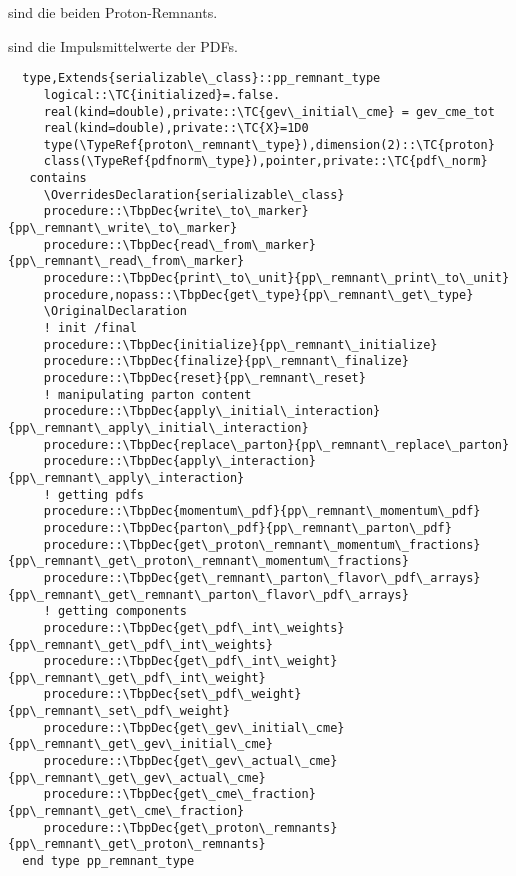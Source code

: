
 sind die beiden Proton-Remnants.

 sind die Impulsmittelwerte der PDFs.
\begin{Verbatim}
  type,Extends{serializable\_class}::pp_remnant_type
     logical::\TC{initialized}=.false.
     real(kind=double),private::\TC{gev\_initial\_cme} = gev_cme_tot
     real(kind=double),private::\TC{X}=1D0
     type(\TypeRef{proton\_remnant\_type}),dimension(2)::\TC{proton}
     class(\TypeRef{pdfnorm\_type}),pointer,private::\TC{pdf\_norm}
   contains
     \OverridesDeclaration{serializable\_class}
     procedure::\TbpDec{write\_to\_marker}{pp\_remnant\_write\_to\_marker}
     procedure::\TbpDec{read\_from\_marker}{pp\_remnant\_read\_from\_marker}
     procedure::\TbpDec{print\_to\_unit}{pp\_remnant\_print\_to\_unit}
     procedure,nopass::\TbpDec{get\_type}{pp\_remnant\_get\_type}
     \OriginalDeclaration
     ! init /final
     procedure::\TbpDec{initialize}{pp\_remnant\_initialize}
     procedure::\TbpDec{finalize}{pp\_remnant\_finalize}
     procedure::\TbpDec{reset}{pp\_remnant\_reset}
     ! manipulating parton content
     procedure::\TbpDec{apply\_initial\_interaction}{pp\_remnant\_apply\_initial\_interaction}
     procedure::\TbpDec{replace\_parton}{pp\_remnant\_replace\_parton}
     procedure::\TbpDec{apply\_interaction}{pp\_remnant\_apply\_interaction}
     ! getting pdfs
     procedure::\TbpDec{momentum\_pdf}{pp\_remnant\_momentum\_pdf}
     procedure::\TbpDec{parton\_pdf}{pp\_remnant\_parton\_pdf}
     procedure::\TbpDec{get\_proton\_remnant\_momentum\_fractions}{pp\_remnant\_get\_proton\_remnant\_momentum\_fractions}
     procedure::\TbpDec{get\_remnant\_parton\_flavor\_pdf\_arrays}{pp\_remnant\_get\_remnant\_parton\_flavor\_pdf\_arrays}     
     ! getting components
     procedure::\TbpDec{get\_pdf\_int\_weights}{pp\_remnant\_get\_pdf\_int\_weights}
     procedure::\TbpDec{get\_pdf\_int\_weight}{pp\_remnant\_get\_pdf\_int\_weight}
     procedure::\TbpDec{set\_pdf\_weight}{pp\_remnant\_set\_pdf\_weight}
     procedure::\TbpDec{get\_gev\_initial\_cme}{pp\_remnant\_get\_gev\_initial\_cme}
     procedure::\TbpDec{get\_gev\_actual\_cme}{pp\_remnant\_get\_gev\_actual\_cme}
     procedure::\TbpDec{get\_cme\_fraction}{pp\_remnant\_get\_cme\_fraction}
     procedure::\TbpDec{get\_proton\_remnants}{pp\_remnant\_get\_proton\_remnants}
  end type pp_remnant_type
\end{Verbatim}
